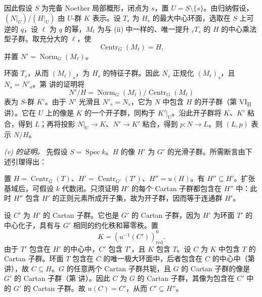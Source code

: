 因此假设 \(S\) 为完备 Noether 局部概形，闭点为 \(s\)，置 \(U=S\setminus\{s\}\)。由归纳假设，\((N|_U)/(H|_U)\) 由 \(U\)-群 \(K\) 表示。设 \(T_s\) 为 \(H_s\) 的最大中心环面，选取在 \(S\) 上可逆的 \(q\)，设 \(\ell\) 为 \(q\) 的幂，\(M_\ell\) 为与 (ii) 中一样的、唯一提升 \({}_\ell T_s\) 的 \(H\) 的中心乘法型子群。取充分大的 \(\ell\)，使
\[
  \operatorname{Centr}_G(M_\ell)=H,
\]
并置 \(N'=\operatorname{Norm}_G(M_\ell)\)。

环面 \(T_s\)，从而 \((M_\ell)_s\)，为 \(H_s\) 的特征子群。因此 \(N_s\) 正规化 \((M_\ell)_s\)，且 \(N_s=N'_s\)。第  讲的证明将
\[
  N'/H
  =\operatorname{Norm}_G(M_\ell)/
   \operatorname{Centr}_G(M_\ell)
\]
表为 \(S\)-群 \(K'\)。由于 \(N'\) 光滑且 \(N'_s=N_s\)，它为 \(N\) 中包含 \(H\) 的开子群（第 VI\textsubscript{B}~ 讲）。它在 \(U\) 上的像是 \(K\) 的一个开子群，同构于 \(K'|_U\)。沿此开子群将 \(K\)、\(K'\) 粘合，得到 \(L\)；再将投影 \(N|_U\to K\)、\(N'\to K'\) 粘合，得到 \(p:N\to L\)。则 \((L,p)\) 表示 \(N/H\)。

\medskip\noindent\textit{(v) 的证明。}
先假设 \(S=\operatorname{Spec}k\)。\(H\) 的像 \(H'\) 为 \(G'\) 的光滑子群。所需断言由下述引理得出：


置 \(H=\operatorname{Centr}_G(T)\)、\(H'=\operatorname{Centr}_{G'}(T')\)、\(H''=u(H)\)。有 \(H''\subseteq H'\)。扩张基域后，可假设 \(k\) 代数闭。只须证明 \(H'\) 的每个 Cartan 子群都包含在 \(H''\) 中：此时 \(H''\) 包含 \(H'\) 的正则元素所成开子集，故为开子群，因而等于连通群 \(H'\)。

设 \(C'\) 为 \(H'\) 的 Cartan 子群。它也是 \(G'\) 的 Cartan 子群，因为 \(H'\) 为环面 \(T'\) 的中心化子，具有与 \(G'\) 相同的约化秩和幂零秩。置
\[
  K=(u^{-1}(C'))^0_{\mathrm{red}}.
\]
由于 \(T'\) 包含在 \(H'\) 的中心中，\(C'\) 包含 \(T'\)，且 \(K\) 包含 \(T\)。设 \(C\) 为 \(K\) 中包含 \(T\) 的 Cartan 子群。环面 \(T\) 包含在 \(C\) 的唯一极大环面中，后者包含在 \(C\) 的中心中（第  讲），故 \(C\subseteq H\)。\(G\) 的任意两个 Cartan 子群共轭，且 \(G\) 的 Cartan 子群的像是 \(G'\) 的 Cartan 子群（第  讲）。因此 \(C\) 为 \(G\) 的 Cartan 子群，其像为包含在 \(C'\) 中的 \(G'\) 的 Cartan 子群。故 \(u(C)=C'\)，从而 \(C'\subseteq H''\)。

